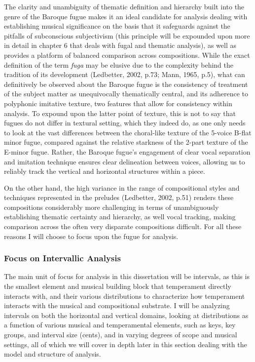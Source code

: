 The clarity and unambiguity of thematic definition and hierarchy built
into the genre of the Baroque fugue makes it an ideal candidate for
analysis dealing with establishing musical significance on the basis
that it safeguards against the pitfalls of subconscious subjectivism
(this principle will be expounded upon more in detail in chapter 6 that
deals with fugal and thematic analysis), as well as provides a platform
of balanced comparison across compositions. While the exact definition
of the term \emph{fuga} may be elusive due to the complexity behind the
tradition of its development (Ledbetter, 2002, p.73; Mann, 1965, p.5),
what can definitively be observed about the Baroque fugue is the
consistency of treatment of the subject matter as unequivocally
thematically central, and its adherence to polyphonic imitative texture,
two features that allow for consistency within analysis. To expound upon
the latter point of texture, this is not to say that fugues do not
differ in textural setting, which they indeed do, as one only needs to
look at the vast differences between the choral-like texture of the
5-voice B-flat minor fugue, compared against the relative starkness of
the 2-part texture of the E-minor fugue. Rather, the Baroque fugue's
engagement of clear vocal separation and imitation technique ensures
clear delineation between voices, allowing us to reliably track the
vertical and horizontal structures within a piece.

On the other hand, the high variance in the range of compositional
styles and techniques represented in the preludes (Ledbetter, 2002,
p.51) renders these compositions considerably more challenging in terms
of unambiguously establishing thematic certainty and hierarchy, as well
vocal tracking, making comparison across the often very disparate
compositions difficult. For all these reasons I will choose to focus
upon the fugue for analysis.

\subsubsection{Focus on Intervallic
Analysis}\label{focus-on-intervallic-analysis}

The main unit of focus for analysis in this dissertation will be
intervals, as this is the smallest element and musical building block
that temperament directly interacts with, and their various
distributions to characterize how temperament interacts with the musical
and compositional substrate. I will be analyzing intervals on both the
horizontal and vertical domains, looking at distributions as a function
of various musical and temperamental elements, such as keys, key groups,
and interval size (cents), and in varying degrees of scope and musical
settings, all of which we will cover in depth later in this section
dealing with the model and structure of analysis.

